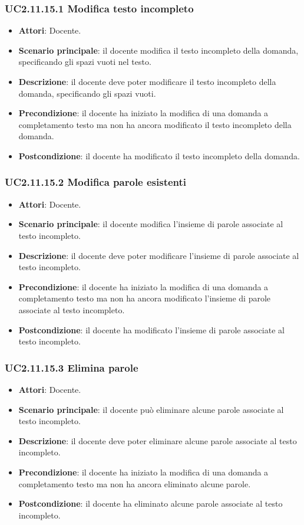 \subsubsection{UC2.11.15.1 Modifica testo incompleto}
\begin{itemize}
\item \textbf{Attori}: Docente.
\item \textbf{Scenario principale}: il docente modifica il testo incompleto della domanda, specificando gli spazi vuoti nel testo.
\item \textbf{Descrizione}: il docente deve poter modificare il testo incompleto della domanda, specificando gli spazi vuoti.
\item \textbf{Precondizione}: il docente ha iniziato la modifica di una domanda a completamento testo ma non ha ancora modificato il testo incompleto della domanda.
\item \textbf{Postcondizione}: il docente ha modificato il testo incompleto della domanda.
\end{itemize}
\subsubsection{UC2.11.15.2 Modifica parole esistenti}
\begin{itemize}
\item \textbf{Attori}: Docente.
\item \textbf{Scenario principale}: il docente modifica l'insieme di parole associate al testo incompleto.
\item \textbf{Descrizione}: il docente deve poter modificare l'insieme di parole associate al testo incompleto.
\item \textbf{Precondizione}: il docente ha iniziato la modifica di una domanda a completamento testo ma non ha ancora modificato l'insieme di parole associate al testo incompleto.
\item \textbf{Postcondizione}: il docente ha modificato l'insieme di parole associate al testo incompleto.
\end{itemize}
\subsubsection{UC2.11.15.3 Elimina parole}
\begin{itemize}
\item \textbf{Attori}: Docente.
\item \textbf{Scenario principale}: il docente può eliminare alcune parole associate al testo incompleto.
\item \textbf{Descrizione}: il docente deve poter eliminare alcune parole associate al testo incompleto.
\item \textbf{Precondizione}: il docente ha iniziato la modifica di una domanda a completamento testo ma non ha ancora eliminato alcune parole.
\item \textbf{Postcondizione}: il docente ha eliminato alcune parole associate al testo incompleto.
\end{itemize}
